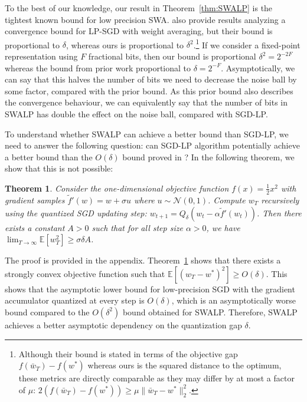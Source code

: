 \documentclass{article}
\newtheorem{theorem}{Theorem}
\begin{document}
To the best of our knowledge, our result in Theorem~\ref{thm:SWALP} is the tightest known bound for low precision SWA. 
\citet{training-quantized-network-deeper-understanding} also provide results analyzing a  convergence bound for LP-SGD with weight averaging, but their bound is proportional to $\delta$, whereas ours is proportional to $\delta^2$.\footnote{Although their bound is stated in terms of the objective gap $f(\bar{w}_T) - f(w^*)$ whereas ours is the squared distance to the optimum, these metrics are directly comparable as they may differ by at most a factor of $\mu$: $2 (f(\bar{w}_T) - f(w^*)) \ge \mu \| \bar{w}_T - w^* \|_2^2$.}
If we consider a fixed-point representation using $F$ fractional bits, then our bound is proportional $\delta^2 = 2^{-2F}$ whereas the bound from prior work proportional to $\delta = 2^{-F}$.
Asymptotically, we can say that this halves the number of bits we need to decrease the noise ball by some factor, compared with the prior bound.
As this prior bound also describes the convergence behaviour, we can equivalently say that the number of bits in SWALP has double the effect on the noise ball, compared with SGD-LP.

To understand whether SWALP can achieve a better bound than SGD-LP, we need to answer the following question: can SGD-LP algorithm potentially achieve a better bound than the $O(\delta)$ bound proved in \citet{training-quantized-network-deeper-understanding}?
In the following theorem, we show that this is not possible:

\begin{theorem} \label{thm:lower-bound}
Consider the one-dimensional objective function $f(x) = \frac{1}{2}x^2$ with gradient samples $\tilde{f}'(w) = w + \sigma u$ where $u \sim \mathcal{N}(0,1)$. Compute $w_T$ recursively using the quantized SGD updating step: $w_{t+1} = Q_\delta(w_t - \alpha \tilde{f}'(w_t))$. Then there exists a constant $A > 0$ such that for all step size $\alpha > 0$, we have
$\lim_{T\to \infty} \mathbb{E}[w_T^2] \geq \sigma \delta A$.
\end{theorem}

The proof is provided in the appendix.
Theorem~\ref{thm:lower-bound} shows that there exists a strongly convex objective function such that $\mathbb{E}[(w_T - w^*)^2] \geq O(\delta)$.
This shows that the asymptotic lower bound for low-precision SGD with the gradient accumulator quantized at every step is $O(\delta)$, which is an asymptotically worse bound compared to the $O(\delta^2)$ bound obtained for SWALP.
Therefore, SWALP achieves a better asymptotic dependency on the quantization gap $\delta$.
\end{document}

